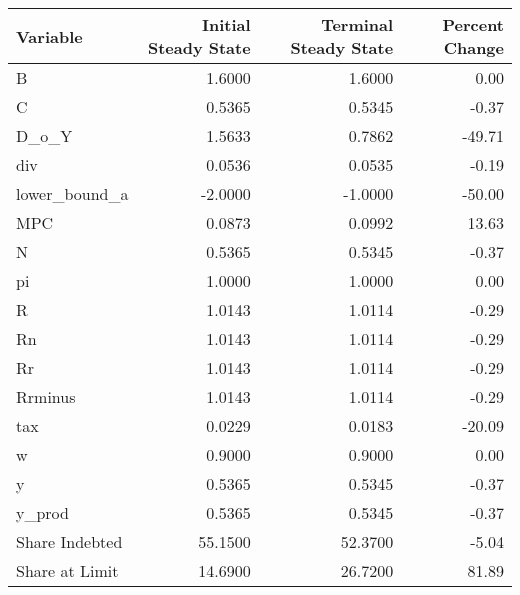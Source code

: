 \begin{table}
\centering
\label{tab:stst_labour}
\begin{tabular}{lrrr}
\toprule
      Variable &  Initial Steady State &  Terminal Steady State &  Percent Change \\
\midrule
             B &                1.6000 &                 1.6000 &            0.00 \\
             C &                0.5365 &                 0.5345 &           -0.37 \\
         D\_o\_Y &                1.5633 &                 0.7862 &          -49.71 \\
           div &                0.0536 &                 0.0535 &           -0.19 \\
 lower\_bound\_a &               -2.0000 &                -1.0000 &          -50.00 \\
           MPC &                0.0873 &                 0.0992 &           13.63 \\
             N &                0.5365 &                 0.5345 &           -0.37 \\
            pi &                1.0000 &                 1.0000 &            0.00 \\
             R &                1.0143 &                 1.0114 &           -0.29 \\
            Rn &                1.0143 &                 1.0114 &           -0.29 \\
            Rr &                1.0143 &                 1.0114 &           -0.29 \\
       Rrminus &                1.0143 &                 1.0114 &           -0.29 \\
           tax &                0.0229 &                 0.0183 &          -20.09 \\
             w &                0.9000 &                 0.9000 &            0.00 \\
             y &                0.5365 &                 0.5345 &           -0.37 \\
        y\_prod &                0.5365 &                 0.5345 &           -0.37 \\
Share Indebted &               55.1500 &                52.3700 &           -5.04 \\
Share at Limit &               14.6900 &                26.7200 &           81.89 \\
\bottomrule
\end{tabular}
\end{table}
